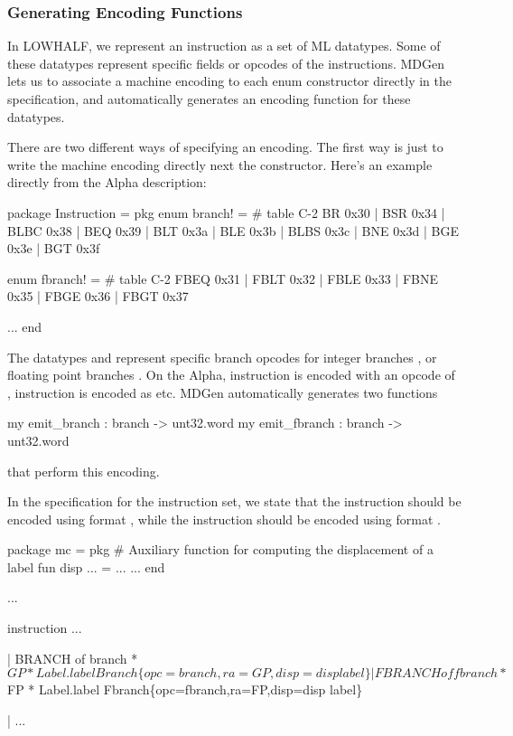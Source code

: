 \subsubsection{Generating Encoding Functions}

   In LOWHALF, we represent an instruction as a set of ML datatypes.
Some of these datatypes represent specific fields or 
opcodes of the instructions.
MDGen lets us to associate a machine encoding to each enum constructor
directly in the specification, and automatically generates an 
encoding function for these datatypes.

There are two different ways of specifying an encoding.  The first way
is just to write the machine encoding directly next the constructor.
Here's an example directly from the Alpha description:
\begin{SML}
   package Instruction =
   pkg
      enum branch! =  #  table C-2 
         BR   0x30
                   | BSR 0x34
                              | BLBC 0x38
       | BEQ  0x39 | BLT 0x3a | BLE  0x3b
       | BLBS 0x3c | BNE 0x3d | BGE  0x3e
       | BGT  0x3f

      enum fbranch! = #  table C-2 
                     FBEQ 0x31 | FBLT 0x32
       | FBLE 0x33             | FBNE 0x35
       | FBGE 0x36 | FBGT 0x37

      ...
   end
\end{SML}

The datatypes  and  represent specific
branch opcodes for integer branches , or floating point
branches .  On the Alpha, instruction  is encoded
with an opcode of , instruction  is encoded 
as  etc.  MDGen automatically generates two functions
\begin{SML}
    my emit_branch : branch -> unt32.word
    my emit_fbranch : branch -> unt32.word
\end{SML}
that perform this encoding.    

In the specification for the instruction set, we state that the
 instruction should be encoded using format ,
while the  instruction should be encoded using
format .
\begin{SML}
   package mc =
   pkg
      #  Auxiliary function for computing the displacement of a label 
      fun disp ... = ...
      ...
   end

   ...

   instruction
     ...

   | BRANCH of branch * $GP * Label.label
     Branch\{opc=branch,ra=GP,disp=disp label\}

   | FBRANCH of fbranch * $FP * Label.label
     Fbranch\{opc=fbranch,ra=FP,disp=disp label\}

   | ...
\end{SML}

